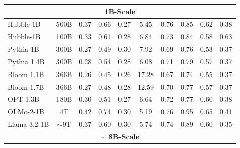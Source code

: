 \begin{table}[h]
\begin{tabular}{lccccccccc}
\midrule
\multicolumn{10}{c}{{\textbf{1B-Scale}}} \\
\midrule
{Hubble-1B} & %
  {500B} &
  {0.37} &
  {0.66} &
  {0.27} &
  {5.45} &
  {0.76} &
  {0.85} &
  {0.62} &
  {0.38} \\
{Hubble-1B} & %
  {100B} &
  {0.33} &
  {0.61} &
  {0.28} &
  {6.84} &
  {0.73} &
  {0.84} &
  {0.58} &
  {0.63} \\
{Pythia 1B} &
  {300B} &
  {0.27} &
  {0.49} &
  {0.30} &
  {7.92} &
  {0.69} &
  {0.76} &
  {0.53} &
  {0.37} \\
{Pythia 1.4B} &
  {300B} &
  {0.28} &
  {0.54} &
  {0.28} &
  {6.08} &
  {0.71} &
  {0.79} &
  {0.57} &
  {0.37} \\
{Bloom 1.1B} &
  {366B} &
  {0.26} &
  {0.45} &
  {0.26} &
  {17.28} &
  {0.67} &
  {0.74} &
  {0.55} &
  {0.37} \\
{Bloom 1.7B} &
  {366B} &
  {0.27} &
  {0.48} &
  {0.28} &
  {12.59} &
  {0.70} &
  {0.77} &
  {0.57} &
  {0.37} \\
{OPT 1.3B} &
  {180B} &
  {0.30} &
  {0.51} &
  {0.27} &
  {6.64} &
  {0.72} &
  {0.77} &
  {0.60} &
  {0.38} \\
{OLMo-2-1B} &
  {4T} &
  {0.42} &
  {0.74} &
  {0.30} &
  {5.19} &
  {0.76} &
  {0.95} &
  {0.65} &
  {0.41} \\ 
{Llama-3.2-1B} &
  {$\sim$9T} &
  {0.37} &
  {0.60} &
  {0.30} &
  {5.74} &
  {0.74} &
  {0.89} &
  {0.60} &
  {0.35} \\  

\midrule
\multicolumn{10}{c}{{\textbf{$\sim$ 8B-Scale}}} \\ \midrule


\end{tabular}
\end{table}
